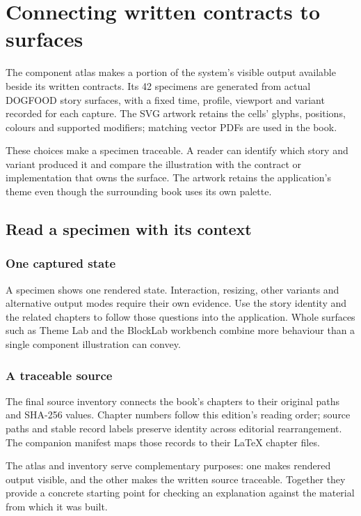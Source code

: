 \chapter*{Connecting written contracts to surfaces}

The component atlas makes a portion of the system's visible output available beside its written contracts. Its 42 specimens are generated from actual DOGFOOD story surfaces, with a fixed time, profile, viewport and variant recorded for each capture. The SVG artwork retains the cells' glyphs, positions, colours and supported modifiers; matching vector PDFs are used in the book.

These choices make a specimen traceable. A reader can identify which story and variant produced it and compare the illustration with the contract or implementation that owns the surface. The artwork retains the application's theme even though the surrounding book uses its own palette.

\section*{Read a specimen with its context}

\subsection*{One captured state}

A specimen shows one rendered state. Interaction, resizing, other variants and alternative output modes require their own evidence. Use the story identity and the related chapters to follow those questions into the application. Whole surfaces such as Theme Lab and the BlockLab workbench combine more behaviour than a single component illustration can convey.

\subsection*{A traceable source}

The final source inventory connects the book's chapters to their original paths and SHA-256 values. Chapter numbers follow this edition's reading order; source paths and stable record labels preserve identity across editorial rearrangement. The companion manifest maps those records to their LaTeX chapter files.

The atlas and inventory serve complementary purposes: one makes rendered output visible, and the other makes the written source traceable. Together they provide a concrete starting point for checking an explanation against the material from which it was built.
